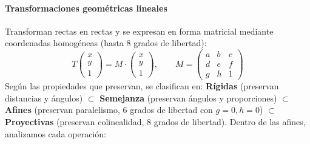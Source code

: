 \documentclass[11pt, a4paper]{article}
\numberwithin{equation}{section}
\begin{document}
\paragraph{Transformaciones geométricas lineales}
Transforman rectas en rectas y se expresan en forma matricial mediante coordenadas homogéneas (hasta 8 grados de libertad):
\begin{equation}
    T\begin{pmatrix} x \\ y \\ 1 \end{pmatrix} = M \cdot \begin{pmatrix} x \\ y \\ 1 \end{pmatrix}, \qquad M = \begin{pmatrix} a & b & c \\ d & e & f \\ g & h & 1 \end{pmatrix}
\end{equation}
Según las propiedades que preservan, se clasifican en: \textbf{Rígidas} (preservan distancias y ángulos) $\subset$ \textbf{Semejanza} (preservan ángulos y proporciones) $\subset$ \textbf{Afines} (preservan paralelismo, 6 grados de libertad con $g=0, h=0$) $\subset$ \textbf{Proyectivas} (preservan colinealidad, 8 grados de libertad). Dentro de las afines, analizamos cada operación:
\end{document}
